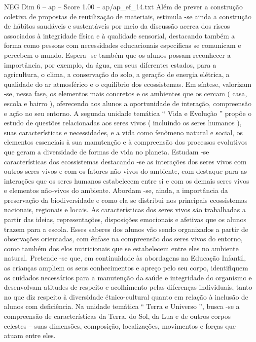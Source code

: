 \begin{textsample}{NEG Dim 6 – ap – Score 1.00 – ap/ap\_ef\_14.txt}
Além de prever a construção coletiva de propostas de reutilização de materiais, estimula -se ainda a construção de hábitos saudáveis e sustentáveis por meio da discussão acerca dos riscos associados à integridade física e à qualidade sensorial, destacando também a forma como pessoas com necessidades educacionais específicas se comunicam e percebem o mundo.
Espera -se também que os alunos possam reconhecer a importância, por exemplo, da água, em seus diferentes estados, para a agricultura, o clima, a conservação do solo, a geração de energia elétrica, a qualidade do ar atmosférico e o equilíbrio dos ecossistemas.
Em síntese, valorizam -se, nessa fase, os elementos mais concretos e os ambientes que os cercam ( casa, escola e bairro ), oferecendo aos alunos a oportunidade de interação, compreensão e ação no seu entorno.
A segunda unidade temática “ Vida e Evolução ” propõe o estudo de questões relacionadas aos seres vivos ( incluindo os seres humanos ), suas características e necessidades, e a vida como fenômeno natural e social, os elementos essenciais à sua manutenção e à compreensão dos processos evolutivos que geram a diversidade de formas de vida no planeta.
Estudam -se características dos ecossistemas destacando -se as interações dos seres vivos com outros seres vivos e com os fatores não-vivos do ambiente, com destaque para as interações que os seres humanos estabelecem entre si e com os demais seres vivos e elementos não-vivos do ambiente.
Abordam -se, ainda, a importância da preservação da biodiversidade e como ela se distribui nos principais ecossistemas nacionais, regionais e locais.
As características dos seres vivos são trabalhadas a partir das ideias, representações, disposições emocionais e afetivas que os alunos trazem para a escola.
Esses saberes dos alunos vão sendo organizados a partir de observações orientadas, com ênfase na compreensão dos seres vivos do entorno, como também dos elos nutricionais que se estabelecem entre eles no ambiente natural.
Pretende -se que, em continuidade às abordagens na Educação Infantil, as crianças ampliem os seus conhecimentos e apreço pelo seu corpo, identifiquem os cuidados necessários para a manutenção da saúde e integridade do organismo e desenvolvam atitudes de respeito e acolhimento pelas diferenças individuais, tanto no que diz respeito à diversidade étnico-cultural quanto em relação à inclusão de alunos com deficiência.
Na unidade temática “ Terra e Universo ”, busca -se a compreensão de características da Terra, do Sol, da Lua e de outros corpos celestes – suas dimensões, composição, localizações, movimentos e forças que atuam entre eles.

\end{textsample}
